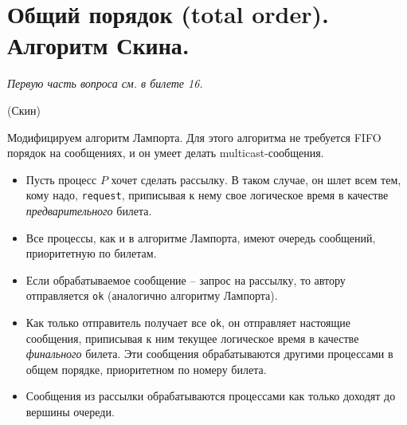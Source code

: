 \section{Общий порядок (total order). Алгоритм Скина.}

\textit{Первую часть вопроса см. в билете 16.}

\begin{algorithm}(Скин)
    
    Модифицируем алгоритм Лампорта. Для этого алгоритма не требуется FIFO порядок 
    на сообщениях, и он умеет делать multicast-сообщения.
    \begin{itemize}
        \item Пусть процесс $P$ хочет сделать рассылку. В таком случае, он
            шлет всем тем, кому надо, \texttt{request}, приписывая к нему свое
            логическое время в качестве \textit{предварительного} билета.
        \item Все процессы, как и в алгоритме Лампорта, имеют очередь сообщений,
            приоритетную по билетам.
        \item Если обрабатываемое сообщение -- запрос на рассылку, то автору 
            отправляется \texttt{ok} (аналогично алгоритму Лампорта).
        \item Как только отправитель получает все \texttt{ok}, он отправляет настоящие
            сообщения, приписывая к ним текущее логическое время в качестве
            \textit{финального} билета. Эти сообщения обрабатываются другими 
            процессами в общем порядке, приоритетном по номеру билета.
        \item Сообщения из рассылки обрабатываются процессами как только доходят
            до вершины очереди.
    \end{itemize}
\end{algorithm}
